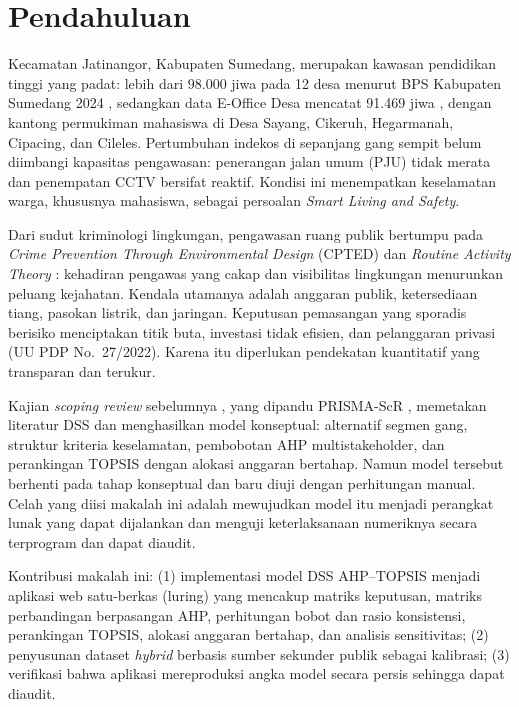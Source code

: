 \documentclass[10pt,twocolumn,a4paper]{article}
\begin{document}
\section{Pendahuluan}

Kecamatan Jatinangor, Kabupaten Sumedang, merupakan kawasan pendidikan tinggi yang padat: lebih dari 98.000 jiwa pada 12 desa menurut BPS Kabupaten Sumedang 2024 \cite{bps}, sedangkan data E-Office Desa mencatat 91.469 jiwa \cite{eoffice}, dengan kantong permukiman mahasiswa di Desa Sayang, Cikeruh, Hegarmanah, Cipacing, dan Cileles. Pertumbuhan indekos di sepanjang gang sempit belum diimbangi kapasitas pengawasan: penerangan jalan umum (PJU) tidak merata dan penempatan CCTV bersifat reaktif. Kondisi ini menempatkan keselamatan warga, khususnya mahasiswa, sebagai persoalan \textit{Smart Living and Safety}.

Dari sudut kriminologi lingkungan, pengawasan ruang publik bertumpu pada \textit{Crime Prevention Through Environmental Design} (CPTED) \cite{crowe} dan \textit{Routine Activity Theory} \cite{cohen}: kehadiran pengawas yang cakap dan visibilitas lingkungan menurunkan peluang kejahatan. Kendala utamanya adalah anggaran publik, ketersediaan tiang, pasokan listrik, dan jaringan. Keputusan pemasangan yang sporadis berisiko menciptakan titik buta, investasi tidak efisien, dan pelanggaran privasi (UU PDP No.~27/2022). Karena itu diperlukan pendekatan kuantitatif yang transparan dan terukur.

Kajian \textit{scoping review} sebelumnya \cite{wang2025,gonzalez2024,feizizadeh2025,ahmed2022,choi2025,kanj2024,kabashkin2025,baddour2026,almassawa2024,shiddiqy2025,zheng2025,yuhang2025}, yang dipandu PRISMA-ScR \cite{tricco}, memetakan literatur DSS dan menghasilkan model konseptual: alternatif segmen gang, struktur kriteria keselamatan, pembobotan AHP multistakeholder, dan perankingan TOPSIS dengan alokasi anggaran bertahap. Namun model tersebut berhenti pada tahap konseptual dan baru diuji dengan perhitungan manual. Celah yang diisi makalah ini adalah mewujudkan model itu menjadi perangkat lunak yang dapat dijalankan dan menguji keterlaksanaan numeriknya secara terprogram dan dapat diaudit.

Kontribusi makalah ini: (1) implementasi model DSS AHP--TOPSIS menjadi aplikasi web satu-berkas (luring) yang mencakup matriks keputusan, matriks perbandingan berpasangan AHP, perhitungan bobot dan rasio konsistensi, perankingan TOPSIS, alokasi anggaran bertahap, dan analisis sensitivitas; (2) penyusunan dataset \textit{hybrid} berbasis sumber sekunder publik sebagai kalibrasi; (3) verifikasi bahwa aplikasi mereproduksi angka model secara persis sehingga dapat diaudit.
\end{document}
